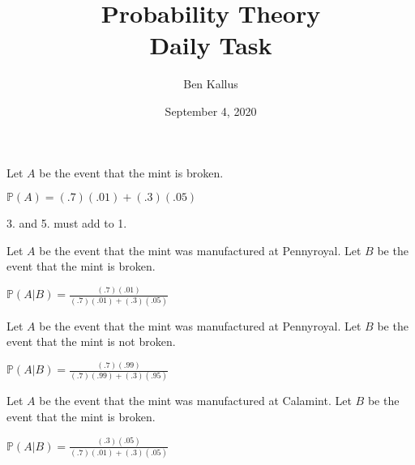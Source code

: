 \documentclass[12pt]{article}
\title{Probability Theory \\ Daily Task}
\author{Ben Kallus}
\date{September 4, 2020}
\begin{document}
\maketitle

    Let $A$ be the event that the mint is broken.

    $\mathbb P(A) = (.7)(.01) + (.3)(.05)$

\medskip
{}
    3. and 5. must add to 1.

\medskip
{}
    Let $A$ be the event that the mint was manufactured at Pennyroyal. Let $B$ be the event that the mint is broken.

    $\mathbb P(A|B) = \frac{(.7)(.01)}{(.7)(.01) + (.3)(.05)}$

\medskip
{}
    Let $A$ be the event that the mint was manufactured at Pennyroyal. Let $B$ be the event that the mint is not broken.
    
    $\mathbb P(A|B) = \frac{(.7)(.99)}{(.7)(.99) + (.3)(.95)}$
    
\medskip
{}
    Let $A$ be the event that the mint was manufactured at Calamint. Let $B$ be the event that the mint is broken.

    $\mathbb P(A|B) = \frac{(.3)(.05)}{(.7)(.01) + (.3)(.05)}$
\end{document}
